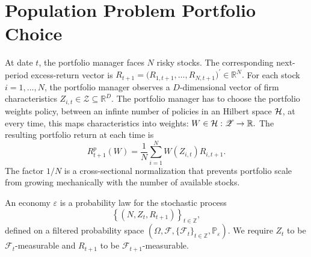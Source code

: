 \section{Population Problem Portfolio Choice}
\label{sec:population_problem}

At date $t$, the portfolio manager faces $N$ risky stocks. The corresponding
next-period excess-return vector is
$
R_{t+1}
=
\bigl(R_{1,t+1},\ldots,R_{N,t+1}\bigr)^\prime
\in\mathbb R^{N}.
$
For each stock $i=1,\ldots,N$, the portfolio manager observes a
$D$-dimensional vector of firm characteristics
$
Z_{i,t}\in\mathscr Z\subseteq\mathbb R^D.
$
The portfolio manager has to choose the portfolio weights policy, between an infinte number of policies in an Hilbert space $\mathcal{H}$, at every time, this maps characteristics into weights: 
$
W\in \mathcal{H}:\mathscr Z\rightarrow\mathbb R.
$
The resulting portfolio return at each time is
\begin{equation}
R^p_{t+1}(W)
=
\frac{1}{N}
\sum_{i=1}^{N}
W(Z_{i,t})R_{i,t+1}.
\label{eq:portfolio_return}
\end{equation}
The factor $1/N$ is a cross-sectional normalization that
prevents portfolio scale from growing mechanically with the number of available
stocks.

\begin{definition}[Economy]
\label{def:economy}
An economy $\varepsilon$ is a probability law for the stochastic process
\[
\left\{
\left(
N,Z_t,R_{t+1}
\right)
\right\}_{t\in\mathbb Z},
\]
defined on a filtered probability space
$(\Omega,\mathscr F,\{\mathscr F_t\}_{t\in\mathbb Z},\mathbb P_{\varepsilon})$.
We require $Z_t$ to be $\mathscr F_t$-measurable and
$R_{t+1}$ to be $\mathscr F_{t+1}$-measurable.
\end{definition}


